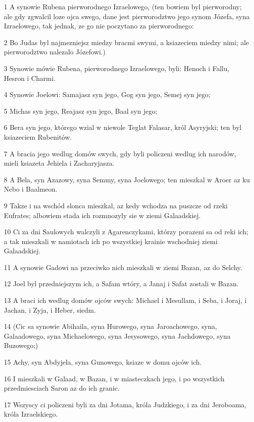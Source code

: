 \par 1 A synowie Rubena pierworodnego Izraelowego, (ten bowiem byl pierworodny; ale gdy zgwalcil loze ojca swego, dane jest pierworodztwo jego synom Józefa, syna Izraelowego, tak jednak, ze go nie poczytano za pierworodnego:
\par 2 Bo Judas byl najmezniejsz miedzy bracmi swymi, a ksiazeciem miedzy nimi; ale pierworodztwo nalezalo Józefowi.)
\par 3 Synowie mówie Rubena, pierworodnego Izraelowego, byli: Henoch i Fallu, Hesron i Charmi.
\par 4 Synowie Joelowi: Samajasz syn jego, Gog syn jego, Semej syn jego;
\par 5 Michas syn jego, Reajasz syn jego, Baal syn jego;
\par 6 Bera syn jego, którego wzial w niewole Teglat Falasar, król Asyryjski; ten byl ksiazeciem Rubenitów.
\par 7 A bracia jego wedlug domów swych, gdy byli policzeni wedlug ich narodów, mieli ksiazeta Jehiela i Zacharyjasza.
\par 8 A Bela, syn Azazowy, syna Semmy, syna Joelowego; ten mieszkal w Aroer az ku Nebo i Baalmeon.
\par 9 Takze i na wschód slonca mieszkal, az kedy wchodza na puszcze od rzeki Eufrates; albowiem stada ich rozmnozyly sie w ziemi Galaadskiej.
\par 10 Ci za dni Saulowych walczyli z Agarenczykami, którzy porazeni sa od reki ich; a tak mieszkali w namiotach ich po wszystkiej krainie wschodniej ziemi Galaadskiej.
\par 11 A synowie Gadowi na przeciwko nich mieszkali w ziemi Bazan, az do Selchy.
\par 12 Joel byl przedniejszym ich, a Safam wtóry, a Janaj i Safat zostali w Bazan.
\par 13 A braci ich wedlug domów ojców swych: Michael i Mesullam, i Seba, i Joraj, i Jachan, i Zyja, i Heber, siedm.
\par 14 (Cic sa synowie Abihaila, syna Hurowego, syna Jaroachowego, syna, Galaadowego, syna Michaelowego, syna Jesysowego, syna Jachdowego, syna Buzowego;)
\par 15 Achy, syn Abdyjela, syna Gunowego, ksiaze w domu ojców ich.
\par 16 I mieszkali w Galaad, w Bazan, i w miasteczkach jego, i po wszystkich przedmiesciach Saron az do ich granic.
\par 17 Wszyscy ci policzeni byli za dni Jotama, króla Judzkiego, i za dni Jeroboama, króla Izraelskiego.
